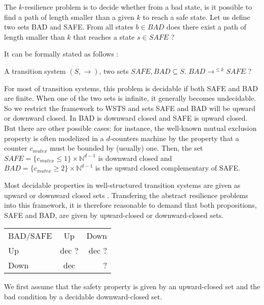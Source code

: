 The $k$-resilience problem is to decide whether from a bad state, is it possible to find a path of length smaller than a given $k$ to reach a safe state. Let us define two sets BAD and SAFE. From all states $b \in BAD$ does there exist a path of length smaller than $k$ that reaches a state $s \in SAFE$ ?

It can be formally stated as follows :

{A transition system $(S,\rightarrow)$, two sets $SAFE, BAD \subseteq S$.}
{$BAD \longrightarrow^{\leq k} SAFE$ ?\newline}
%

For most of transition systems, this problem is decidable if both SAFE and BAD are finite. When one of the two sets is infinite, it generally becomes undecidable. So we restrict the framework to WSTS and sets SAFE and BAD will be upward or downward closed. In \cite{DBLP:conf/gg/Ozkan22} BAD is downward closed and SAFE is upward closed. But there are other possible cases: for instance, the well-known mutual exclusion property is often modelized in a $d$-counters machine by the property that a counter $c_{mutex}$ must be bounded by (usually) one. Then, the set $SAFE =  \{c_{mutex} \leq 1\} \times \mathbb{N}^{d-1}$ is downward closed and $BAD =\{c_{mutex} \geq 2\} \times  \mathbb{N}^{d-1} $ is the upward closed complementary of SAFE.
%		

Most decidable properties in well-structured transition systems are given as upward or downward closed sets \cite{DBLP:journals/iandc/AbdullaCJT00, DBLP:journals/tcs/FinkelS01}.
Transfering the abstract resilience problems into this framework,
it is therefore reasonable to demand that both propositions, SAFE and BAD, are given by 
upward-closed or downward-closed sets.

\begin{tabular}{ l c r }
   BAD/SAFE & Up & Down \\
   Up & dec ? & dec ? \\
   Down & dec & ? \\
 \end{tabular}

We first assume that the safety property is given by an upward-closed set and the bad condition by a decidable downward-closed set. 

